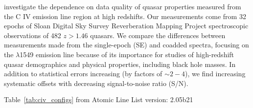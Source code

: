 \documentclass[a4paper,fleqn,usenatbib]{mnras}
\begin{document}
\citet{Denney2016}
investigate the dependence on data quality of quasar properties
measured from the C IV emission line region at high redshifts.  Our
measurements come from 32 epochs of Sloan Digital Sky Survey
Reverberation Mapping Project spectroscopic observations of 482 $z >
1.46$ quasars. We compare the differences between measurements made
from the single-epoch (SE) and coadded spectra, focusing on the \civ
$\lambda$1549 emission line because of its importance for studies of
high-redshift quasar demographics and physical properties, including
black hole masses. In addition to statistical errors increasing (by
factors of $\sim2-4$), we find increasing systematic offsets with
decreasing signal-to-noise ratio (S/N).


\citet{Grier2015}




Table~\ref{tab:civ_configs} from 
Atomic Line List version: 2.05b21  
\citep{Tunklev1997} \\

\citep[NIST; ][]{Reader2012AAS, Kramida2018}\\

%
%
% 
\end{document}
